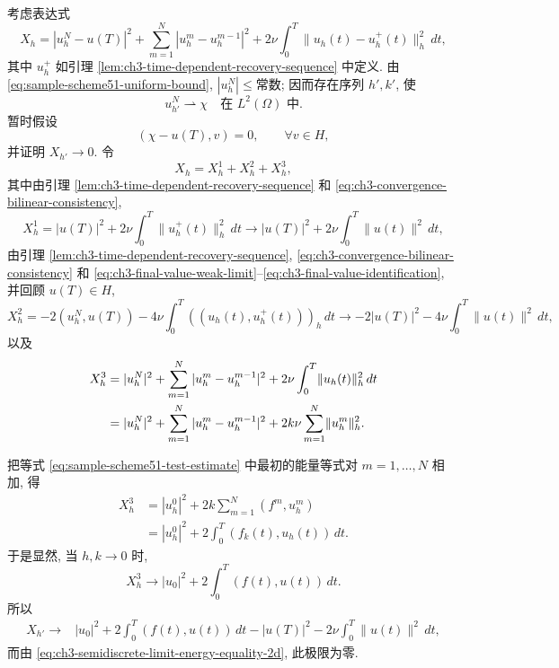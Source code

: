 {{\begin{Proof}
考虑表达式
\[
X_h=|u_h^N-u(T)|^2+\sum_{m=1}^N|u_h^m-u_h^{m-1}|^2
+2\nu\int_0^T\lVert u_h(t)-u_h^+(t)\rVert_h^2\,dt,
\]
其中 $u_h^+$ 如引理 \ref{lem:ch3-time-dependent-recovery-sequence} 中定义. 由 \eqref{eq:sample-scheme51-uniform-bound}, $|u_h^N|\leq\text{常数}$; 因而存在序列 $h',k'$, 使
\begin{equation}
u_{h'}^N\rightharpoonup\chi
\quad\text{在 }L^2(\Omega)\text{ 中}.
\label{eq:ch3-final-value-weak-limit}
\end{equation}
暂时假设
\begin{equation}
(\chi-u(T),v)=0,
\qquad\forall v\in H,
\label{eq:ch3-final-value-identification}
\end{equation}
并证明 $X_{h'}\to0$. 令
\[
X_h=X_h^1+X_h^2+X_h^3,
\]
其中由引理 \ref{lem:ch3-time-dependent-recovery-sequence} 和 \eqref{eq:ch3-convergence-bilinear-consistency},
\[
X_h^1=|u(T)|^2+2\nu\int_0^T\lVert u_h^+(t)\rVert_h^2\,dt
\longrightarrow|u(T)|^2+2\nu\int_0^T\lVert u(t)\rVert^2\,dt,
\]
由引理 \ref{lem:ch3-time-dependent-recovery-sequence}, \eqref{eq:ch3-convergence-bilinear-consistency} 和 \eqref{eq:ch3-final-value-weak-limit}--\eqref{eq:ch3-final-value-identification}, 并回顾 $u(T)\in H$,
\[
X_h^2=-2(u_h^N,u(T))-4\nu\int_0^T((u_h(t),u_h^+(t)))_h\,dt
\longrightarrow-2|u(T)|^2-4\nu\int_0^T\lVert u(t)\rVert^2\,dt,
\]
以及
\begin{align}
X_h^3
&=|u_h^N|^2+\sum_{m=1}^N|u_h^m-u_h^{m-1}|^2
+2\nu\int_0^T\lVert u_h(t)\rVert_h^2\,dt\notag\\
&=|u_h^N|^2+\sum_{m=1}^N|u_h^m-u_h^{m-1}|^2
+2k\nu\sum_{m=1}^N\lVert u_h^m\rVert_h^2.
\label{eq:ch3-strong-prolongation-x3}
\end{align}

\hypertarget{chapter-03-page-260}{}
把等式 \eqref{eq:sample-scheme51-test-estimate} 中最初的能量等式对 $m=1,\ldots,N$ 相加, 得
\begin{align*}
X_h^3
&=|u_h^0|^2+2k\sum_{m=1}^N(f^m,u_h^m)\\
&=|u_h^0|^2+2\int_0^T(f_k(t),u_h(t))\,dt.
\end{align*}
于是显然, 当 $h,k\to0$ 时,
\[
X_h^3\longrightarrow|u_0|^2+2\int_0^T(f(t),u(t))\,dt.
\]
所以
\begin{align}
X_{h'}\longrightarrow{}&|u_0|^2+2\int_0^T(f(t),u(t))\,dt
-|u(T)|^2-2\nu\int_0^T\lVert u(t)\rVert^2\,dt,
\label{eq:ch3-strong-prolongation-energy-limit}
\end{align}
而由 \eqref{eq:ch3-semidiscrete-limit-energy-equality-2d}, 此极限为零.


\end{Proof}}}
